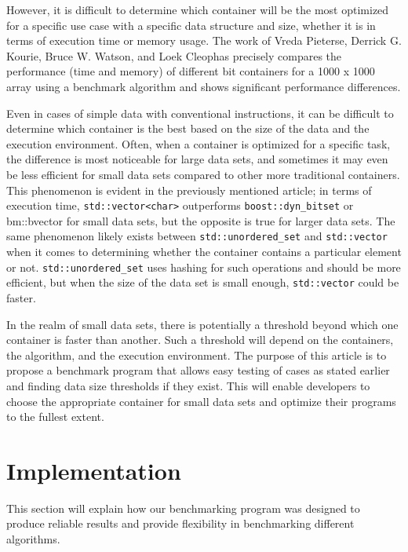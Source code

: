 \documentclass[conference]{IEEEtran} \IEEEoverridecommandlockouts \usepackage{graphicx}
\def\code#1{\texttt{#1}}
\begin{document}
However, it is difficult to determine which container will be the most optimized for a
specific use case with a specific data structure and size, whether it is in terms of
execution time or memory usage. The work of Vreda Pieterse, Derrick G. Kourie, Bruce
W. Watson, and Loek Cleophas \cite{https://doi.org/10.1145/1899503.1899530} precisely
compares the performance (time and memory) of different bit containers for a 1000 x 1000
array using a benchmark algorithm and shows significant performance differences.

Even in cases of simple data with conventional instructions, it can be difficult to
determine which container is the best based on the size of the data and the execution
environment. Often, when a container is optimized for a specific task, the difference is
most noticeable for large data sets, and sometimes it may even be less efficient for small
data sets compared to other more traditional containers. This phenomenon is evident in the
previously mentioned article\cite{https://doi.org/10.1145/1899503.1899530}; in terms of
execution time, \code{std::vector<char>} outperforms \code{boost::dyn\_bitset} or
bm::bvector for small data sets, but the opposite is true for larger data sets. The same
phenomenon likely exists between \code{std::unordered\_set} and \code{std::vector} when it
comes to determining whether the container contains a particular element or
not. \code{std::unordered\_set} uses hashing for such operations and should be more
efficient, but when the size of the data set is small enough, \code{std::vector} could be
faster.

In the realm of small data sets, there is potentially a threshold beyond which one
container is faster than another. Such a threshold will depend on the containers, the
algorithm, and the execution environment. The purpose of this article is to propose a
benchmark program that allows easy testing of cases as stated earlier and finding data
size thresholds if they exist. This will enable developers to choose the appropriate
container for small data sets and optimize their programs to the fullest extent.

\section{Implementation}

This section will explain how our benchmarking program was designed to
produce reliable results and provide flexibility in benchmarking
different algorithms.
\end{document}
